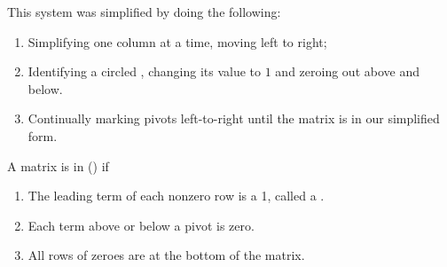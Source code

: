 \begin{applicationActivities}
\begin{observation}
This system was simplified by doing the following:
\begin{enumerate}
\item Simplifying one column at a time, moving left to right;
\item Identifying a circled , changing its value to \(1\)
      and zeroing out above and below.
\item Continually marking pivots left-to-right until the matrix is
      in our simplified form.
\end{enumerate}
\end{observation}

\begin{activity}{10}
A matrix is in  () if
\begin{enumerate}
\item The leading term of each nonzero row is a 1, called a .
\item Each term above or below a pivot is zero.
\item All rows of zeroes are at the bottom of the matrix.
\end{enumerate}


\end{activity}
\end{applicationActivities}
